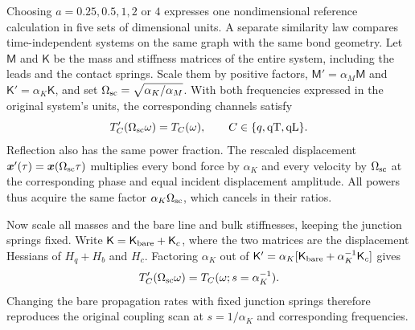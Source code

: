\documentclass[10pt,aps,onecolumn,floatfix,notitlepage,nofootinbib,showkeys]{revtex4-2}
\newcommand{\vx}{\bm{x}}
\newcommand{\qT}{\mathrm{qT}}
\newcommand{\qL}{\mathrm{qL}}
\begin{document}
Choosing $a=0.25,0.5,1,2$ or $4$ expresses one nondimensional reference calculation in five sets of dimensional units. A separate similarity law compares time-independent systems on the same graph with the same bond geometry. Let $\mathsf M$ and $\mathsf K$ be the mass and stiffness matrices of the entire system, including the leads and the contact springs. Scale them by positive factors, $\mathsf M'=\alpha_M\mathsf M$ and $\mathsf K'=\alpha_K\mathsf K$, and set $\Omega_{\rm sc}=\sqrt{\alpha_K/\alpha_M}$. With both frequencies expressed in the original system's units, the corresponding channels satisfy
\begin{equation}
 T'_C(\Omega_{\rm sc}\omega)=T_C(\omega),
 \qquad C\in\{q,\qT,\qL\}.
 \label{eq:s9-complete-scaling}
\end{equation}
Reflection also has the same power fraction. The rescaled displacement $\vx'(\tau)=\vx(\Omega_{\rm sc}\tau)$ multiplies every bond force by $\alpha_K$ and every velocity by $\Omega_{\rm sc}$ at the corresponding phase and equal incident displacement amplitude. All powers thus acquire the same factor $\alpha_K\Omega_{\rm sc}$, which cancels in their ratios.

Now scale all masses and the bare line and bulk stiffnesses, keeping the junction springs fixed. Write $\mathsf K=\mathsf K_{\rm bare}+\mathsf K_c$, where the two matrices are the displacement Hessians of $H_q+H_b$ and $H_c$. Factoring $\alpha_K$ out of $\mathsf K'=\alpha_K[\mathsf K_{\rm bare}+\alpha_K^{-1}\mathsf K_c]$ gives
\begin{equation}
 T'_C(\Omega_{\rm sc}\omega)
 =T_C(\omega;s=\alpha_K^{-1}).
 \label{eq:s9-partial-scaling}
\end{equation}
Changing the bare propagation rates with fixed junction springs therefore reproduces the original coupling scan at $s=1/\alpha_K$ and corresponding frequencies.
\end{document}
